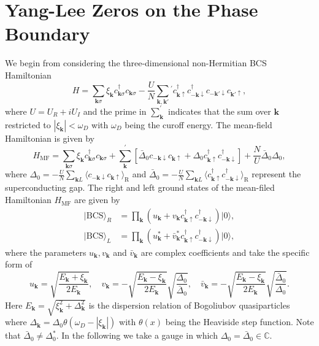 \documentclass[aps,onecolumn,nofootinbib,superscriptaddress,notitlepage,longbibliography]{revtex4-1}
\begin{document}
\section{Yang-Lee Zeros on the Phase Boundary}
We begin from considering the three-dimensional non-Hermitian BCS Hamiltonian
\begin{equation}
	H=\sum_{\boldsymbol{k}\sigma}\xi_{\boldsymbol{k}}c_{\boldsymbol{k}\sigma}^{\dagger}c_{\boldsymbol{k}\sigma}-\frac{U}{N}\sum_{\bm{k},\bm{k}'}{}^{'}c_{\bm{k}\uparrow}^{\dagger}c_{\bm{-k}\downarrow}^{\dagger}c_{\bm{-k}'\downarrow}c_{\bm{k}'\uparrow}, \label{eq:non-Hermitian}
	\end{equation}
where $U=U_R+iU_I$ and the prime in $\sum_{\bm{k}}^{'}$ indicates that the sum over $\bm{k}$ restricted to  $|\xi_{\boldsymbol{k}}|<\omega_D$ with $\omega_D$ being the curoff energy. The mean-field Hamiltonian is given by 
\begin{equation}
H_{\mathrm{MF}}=\sum_{\boldsymbol{k}\sigma}\xi_{\boldsymbol{k}}c_{\boldsymbol{k}\sigma}^{\dagger}c_{\boldsymbol{k}\sigma}+\sum_{\bm{k}}^{'}[\bar{\Delta}_0c_{-\bm{k}\downarrow}c_{\bm{k}\uparrow}+\Delta_0 c_{\bm{k}\uparrow}^{\dagger}c_{-\bm{k}\downarrow}^{\dagger}]+\frac{N}{U}\bar{\Delta}_{0}\Delta_{0},
\end{equation}
 where $\Delta_{0}=-\frac{U}{N}\sum_{\boldsymbol{k}L}\langle c_{-\boldsymbol{k}\downarrow}c_{\boldsymbol{k}\uparrow}\rangle_{\mathrm{R}}$ and $\bar{\Delta}_0=-\frac{U}{N}\sum_{\boldsymbol{k}L}\langle c^{\dagger}_{\boldsymbol{k}\uparrow}c^{\dagger}_{-\boldsymbol{k}\downarrow}\rangle_{\mathrm{R}}$ represent the superconducting gap. The right and left ground states of the mean-filed Hamiltonian $H_{\mathrm{MF}}$ are given by \cite{Yamamoto2019}
\begin{align}
	|\text{BCS}\rangle_{R}&=\prod_{\bm{k}}(u_{\bm{k}}+v_{\bm{k}}c_{\boldsymbol{k}\uparrow}^{\dagger}c_{-\boldsymbol{k}\downarrow}^{\dagger})|0\rangle,\\
	|\text{BCS}\rangle_{L}&=\prod_{\bm{k}}(u^{*}_{\bm{k}}+\bar{v}^{*}_{\bm{k}}c_{\boldsymbol{k}\uparrow}^{\dagger}c_{-\boldsymbol{k}\downarrow}^{\dagger})|0\rangle,
\end{align}
where the parameters $u_{\bm{k}},v_{\bm{k}}$ and $\bar{v}_{\bm{k}}$ are complex coefficients and take the specific form of
\begin{equation}
	u_{\bm{k}}=\sqrt{\frac{E_{\bm{k}}+\xi_{\bm{k}}}{2E_{\bm{k}}}},\quad v_{\bm{k}}=-\sqrt{\frac{E_{\bm{k}}-\xi_{\bm{k}}}{2E_{\bm{k}}}}\sqrt{\frac{\Delta_0}{\bar{\Delta}_0}},\quad
	\bar{v}_{\bm{k}}=-\sqrt{\frac{E_{\bm{k}}-\xi_{\bm{k}}}{2E_{\bm{k}}}}\sqrt{\frac{\bar{\Delta}_0}{\Delta_0}}.
\end{equation}
Here $E_{\bm{k}}=\sqrt{\xi_{\bm{k}}^2+\Delta_{\bm{k}}^2}$ is the dispersion relation of Bogoliubov quasiparticles where $\Delta_{\bm{k}}=\Delta_0\theta(\omega_D-|\xi_{\bm{k}}|)$ with $\theta(x)$ being the Heaviside step function. Note that $\bar{\Delta}_0\neq\Delta_0^*$. In the following we take a gauge  \cite{Yamamoto2019} in which $\Delta_0=\bar{\Delta}_0\in\mathbb{C}$.
\end{document}
